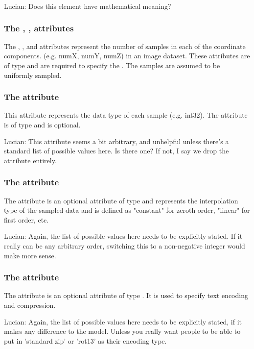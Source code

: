 {\color{red} Lucian: \notice Does this element have mathematical meaning?}

\subsubsection{The , ,  attributes}
The , , and  attributes represent the number of samples in each of the coordinate components. (e.g. numX, numY, numZ) in an image dataset.  These attributes are of type  and are required to specify the \SampledField. The samples are assumed to be uniformly sampled.

\subsubsection{The  attribute}
This attribute represents the data type of each sample (e.g. int32). The attribute is of type  and is optional.

{\color{red} Lucian: \notice This attribute seems a bit arbitrary, and unhelpful unless there's a standard list of possible values here.  Is there one?  If not, I say we drop the attribute entirely.}


\subsubsection{The  attribute}
The  attribute is an optional attribute of type  and represents the interpolation type of the sampled data and is defined as "constant" for zeroth order, "linear" for first order, etc.

{\color{red} Lucian: \notice Again, the list of possible values here needs to be explicitly stated.  If it really can be any arbitrary order, switching this to a non-negative integer would make more sense.}

\subsubsection{The  attribute}
The  attribute is an optional attribute of type . It is used to specify text encoding and compression.

{\color{red} Lucian: \notice Again, the list of possible values here needs to be explicitly stated, if it makes any difference to the model.  Unless you really want people to be able to put in 'standard zip' or 'rot13' as their encoding type.}



